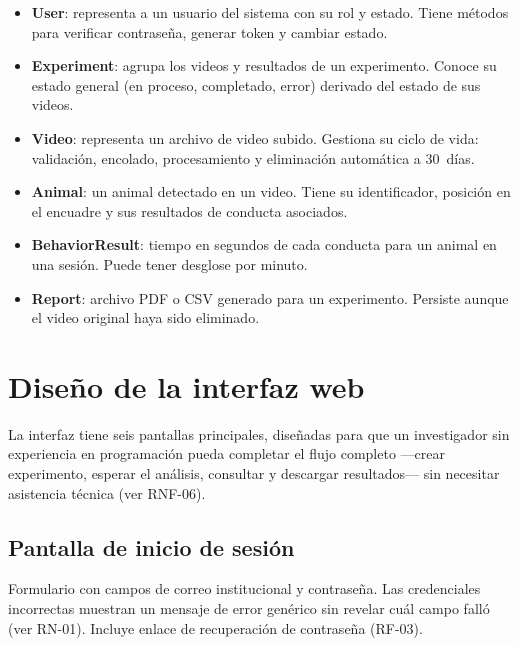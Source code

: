 \begin{itemize}
  \item \textbf{User}: representa a un usuario del sistema con su rol y estado.
        Tiene métodos para verificar contraseña, generar token y cambiar estado.

  \item \textbf{Experiment}: agrupa los videos y resultados de un experimento.
        Conoce su estado general (en proceso, completado, error) derivado del
        estado de sus videos.

  \item \textbf{Video}: representa un archivo de video subido. Gestiona su ciclo
        de vida: validación, encolado, procesamiento y eliminación automática a
        30~días.

  \item \textbf{Animal}: un animal detectado en un video. Tiene su identificador,
        posición en el encuadre y sus resultados de conducta asociados.

  \item \textbf{BehaviorResult}: tiempo en segundos de cada conducta para un
        animal en una sesión. Puede tener desglose por minuto.

  \item \textbf{Report}: archivo PDF o CSV generado para un experimento. Persiste
        aunque el video original haya sido eliminado.
\end{itemize}

\section{Diseño de la interfaz web}

La interfaz tiene seis pantallas principales, diseñadas para que un investigador sin
experiencia en programación pueda completar el flujo completo ---crear experimento,
esperar el análisis, consultar y descargar resultados--- sin necesitar asistencia
técnica (ver RNF-06).

\subsection{Pantalla de inicio de sesión}

Formulario con campos de correo institucional y contraseña. Las credenciales
incorrectas muestran un mensaje de error genérico sin revelar cuál campo falló
(ver RN-01). Incluye enlace de recuperación de contraseña (RF-03).

